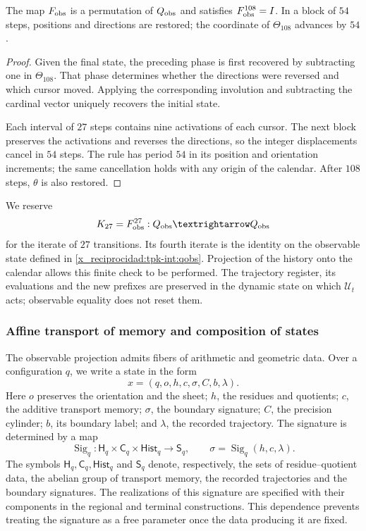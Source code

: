 \begin{proposition}
\label{x_reciprocidad:tpk-int:periodo}
The map \(F_{\rm obs}\) is a permutation of
\(\mathcal Q_{\rm obs}\) and satisfies \(F_{\rm obs}^{108}=I\).
In a block of \(54\) steps, positions and directions are restored;
the coordinate of \(\Theta_{108}\) advances by \(54\).
\end{proposition}
\begin{proof}
Given the final state, the preceding phase is first recovered by subtracting one
in \(\Theta_{108}\). That phase determines whether the
directions were reversed and which cursor moved. Applying the corresponding involution
and subtracting the cardinal vector uniquely recovers the initial state.

Each interval of \(27\) steps contains nine activations of each
cursor. The next block preserves the activations and reverses the
directions, so the integer displacements cancel in
\(54\) steps. The rule has period \(54\) in its position
and orientation increments; the same cancellation holds with any origin
of the calendar. After \(108\) steps, \(\theta\) is also restored.
\end{proof}

We reserve
\[
 \mathcal K_{27}=F_{\rm obs}^{27}:
 \mathcal Q_{\rm obs}\longrightarrow\mathcal Q_{\rm obs}
\]
for the iterate of \(27\) transitions. Its fourth iterate is the
identity on the observable state defined in \eqref{x_reciprocidad:tpk-int:qobs}.
Projection of the history onto the calendar allows this
finite check to be performed. The trajectory register, its evaluations and
the new prefixes are preserved in the dynamic state on which
\(\mathcal U_t\) acts; observable equality does not reset them.

\subsubsection{Affine transport of memory and composition of states}
\label{x_reciprocidad:tpk-int:memoria}

The observable projection admits fibers of arithmetic and geometric data.
Over a configuration \(q\), we write a state in the form
\[
 x=(q,o,h,c,\sigma,C,b,\lambda).
\]
Here \(o\) preserves the orientation and the sheet; \(h\), the residues
and quotients; \(c\), the additive transport memory; \(\sigma\),
the boundary signature; \(C\), the precision cylinder; \(b\), its
boundary label; and \(\lambda\), the recorded trajectory. The
signature is determined by a map
\[
 \operatorname{Sig}_q:
 \mathsf H_q\times\mathsf C_q\times\mathsf{Hist}_q
 \longrightarrow\mathsf S_q,
 \qquad \sigma=\operatorname{Sig}_q(h,c,\lambda).
\]
The symbols \(\mathsf H_q,\mathsf C_q,\mathsf{Hist}_q\) and
\(\mathsf S_q\) denote, respectively, the sets of residue--quotient
data, the abelian group of transport memory, the
recorded trajectories and the boundary signatures.
The realizations of this signature are specified with their components in
the regional and terminal constructions. This dependence prevents treating
the signature as a free parameter once the data producing it are fixed.

